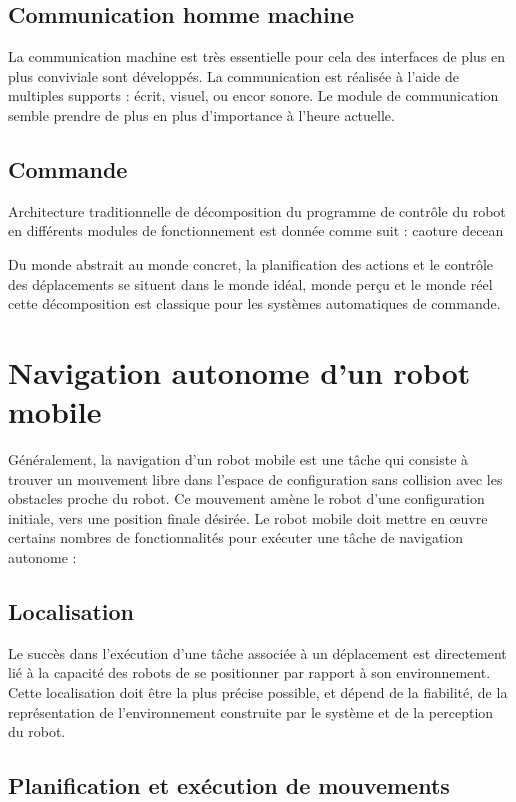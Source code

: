 \subsection{Communication homme machine}

La communication machine est très essentielle pour cela des interfaces de plus en plus conviviale sont développés.
La communication est réalisée à l’aide de multiples supports : écrit, visuel, ou encor sonore. Le module de communication semble prendre de plus en plus d’importance à l’heure actuelle.
\subsection{Commande}

Architecture traditionnelle de décomposition du programme de contrôle du robot en différents modules de fonctionnement est donnée comme suit :
caoture decean 

Du monde abstrait au monde concret, la planification des actions et le contrôle des déplacements se situent dans le monde idéal, monde perçu et le monde réel cette décomposition est classique pour les systèmes automatiques de commande.
\section{Navigation autonome d’un robot mobile
}
Généralement, la navigation d’un robot mobile est une tâche qui consiste à trouver un mouvement libre dans l’espace de configuration sans collision avec les obstacles proche du robot. Ce mouvement amène le robot d’une configuration initiale, vers une position finale désirée.
Le robot mobile doit mettre en œuvre certains nombres de fonctionnalités pour exécuter une tâche de navigation autonome :
\subsection{Localisation}

Le succès dans l’exécution d’une tâche associée à un déplacement est directement lié à la capacité des robots de se positionner par rapport à son environnement. Cette localisation doit être la plus précise possible, et dépend de la fiabilité, de la représentation de l’environnement construite par le système et de la perception du robot.
\subsection{Planification et exécution de mouvements}


